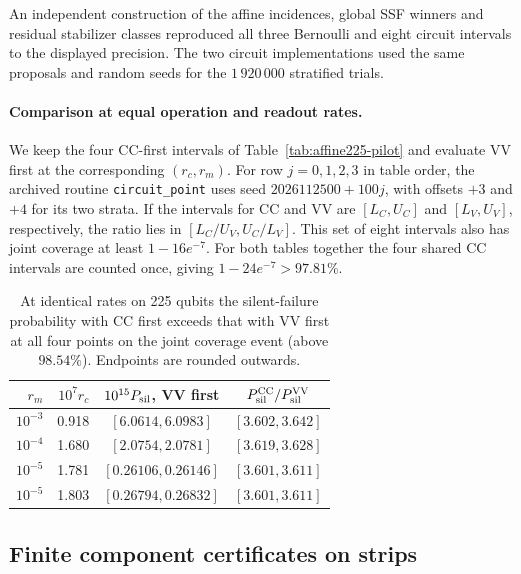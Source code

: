\documentclass[10pt,twocolumn]{article}
\theoremstyle{definition}
\begin{document}
An independent construction of the affine incidences, global SSF
winners and residual stabilizer classes reproduced all three Bernoulli
and eight circuit intervals to the displayed precision. The two circuit
implementations used the same proposals and random seeds for the
$1\,920\,000$ stratified trials.

\paragraph{Comparison at equal operation and readout rates.}
We keep the four CC-first intervals of Table~\ref{tab:affine225-pilot}
and evaluate VV first at the corresponding $(r_c,r_m)$. For row
$j=0,1,2,3$ in table order, the archived routine
\texttt{circuit\_point} uses seed $2026112500+100j$, with offsets
$+3$ and $+4$ for its two strata. If the intervals for CC and VV
are $[L_C,U_C]$ and $[L_V,U_V]$, respectively, the ratio lies in
$[L_C/U_V,U_C/L_V]$. This set of eight intervals also has joint
coverage at least $1-16e^{-7}$. For both tables together the four
shared CC intervals are counted once, giving $1-24e^{-7}>97.81\%$.

\begin{table}[H]
\centering\small
\setlength{\tabcolsep}{3pt}
\caption{At identical rates on 225 qubits the silent-failure
probability with CC first exceeds that with VV first at all four
points on the joint coverage event (above $98.54\%$). Endpoints are
rounded outwards.}
\label{tab:matched-gates}
\smallskip
\begin{tabular}{@{}rrcc@{}}
\toprule
$r_m$ & $10^7r_c$ & $10^{15}P_{\rm sil}$, VV first &
$P_{\rm sil}^{\rm CC}/P_{\rm sil}^{\rm VV}$\\
\midrule
$10^{-3}$ & 0.918 & $[6.0614,6.0983]$ & $[3.602,3.642]$\\
$10^{-4}$ & 1.680 & $[2.0754,2.0781]$ & $[3.619,3.628]$\\
$10^{-5}$ & 1.781 & $[0.26106,0.26146]$ & $[3.601,3.611]$\\
$10^{-5}$ & 1.803 & $[0.26794,0.26832]$ & $[3.601,3.611]$\\
\bottomrule
\end{tabular}
\end{table}

\subsection{Finite component certificates on strips}\label{app:strip-certificates}
\end{document}
